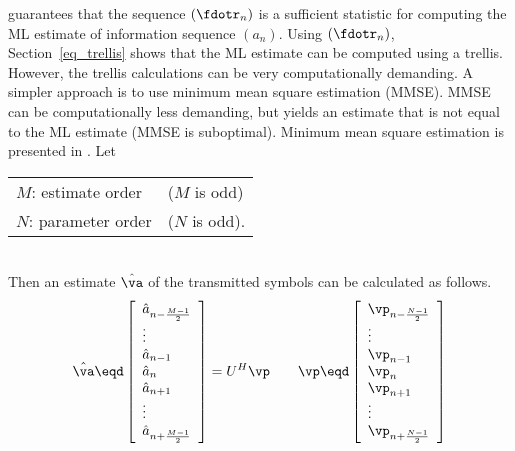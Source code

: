  guarantees that the sequence $(\fdotr_n)$
is a sufficient statistic for computing the ML estimate of information
sequence $(a_n)$.
Using $(\fdotr_n)$, Section~\ref{eq_trellis} shows that the ML estimate
can be computed using a trellis.
However, the trellis calculations can be very computationally demanding.
A simpler approach is to use minimum mean square estimation (MMSE).
MMSE can be computationally less demanding, but yields an estimate
that is not equal to the ML estimate (MMSE is suboptimal).
Minimum mean square estimation is presented in .
Let
\\\indentx
\begin{tabular}{ll}
   $M$: estimate order  & ($M$ is odd)\\
   $N$: parameter order & ($N$ is odd).
\end{tabular}
\\
Then an estimate $\hat{\va}$ of the transmitted symbols can be calculated
as follows.
\[
   \hat{\va} \eqd
   \left[\begin{array}{l}
      \hat{a}_{n-\frac{M-1}{2}} \\
      \vdots                    \\
      \hat{a}_{n-1}             \\
      \hat{a}_{n}               \\
      \hat{a}_{n+1}             \\
      \vdots                    \\
      \hat{a}_{n+\frac{M-1}{2}}
   \end{array}\right]
   = U^H \vp
%
   \qquad
%
   \vp \eqd
   \left[\begin{array}{l}
      \vp_{n-\frac{N-1}{2}} \\
      \vdots                    \\
      \vp_{n-1}             \\
      \vp_{n}               \\
      \vp_{n+1}             \\
      \vdots                    \\
      \vp_{n+\frac{N-1}{2}}
   \end{array}\right]
\]

